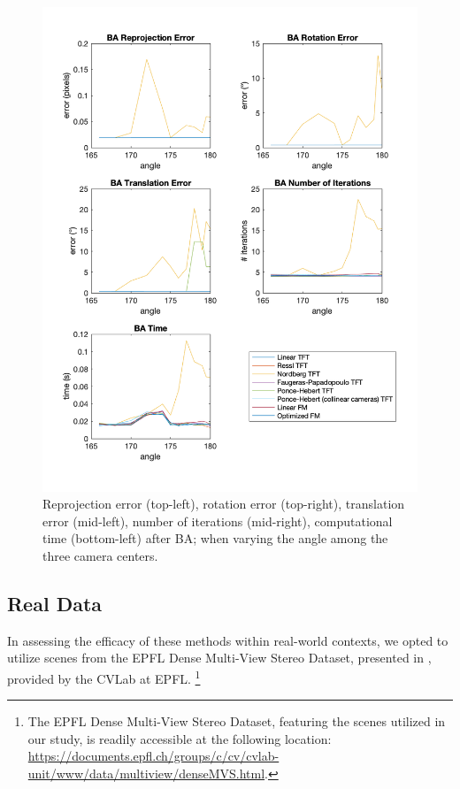 \begin{figure}[p]
	\centering
	\includegraphics[width=1\textwidth]{Experiments/Synthetic/angle/BAanglePlots.png}
	\caption[Synthetic Trial varying Camera Centers Angle with \acs{BA}]{Reprojection error (top-left), rotation error (top-right), translation error (mid-left), number of iterations (mid-right), computational time (bottom-left) after \acs{BA}; when varying the angle among the three camera centers.}
	\label{fig:BAAnglePlot}
\end{figure}

\pagebreak

\subsection{Real Data}
In assessing the efficacy of these methods within real-world contexts, we opted to utilize scenes from the EPFL Dense Multi-View Stereo Dataset, presented in \cite{13-epfl-dataset}, provided by the CVLab at EPFL. \footnote{The EPFL Dense Multi-View Stereo Dataset, featuring the scenes utilized in our study, is readily accessible at the following location: \href{https://documents.epfl.ch/groups/c/cv/cvlab-unit/www/data/multiview/denseMVS.html}{https://documents.epfl.ch/groups/c/cv/cvlab-unit/www/data/multiview/denseMVS.html}.}\\

